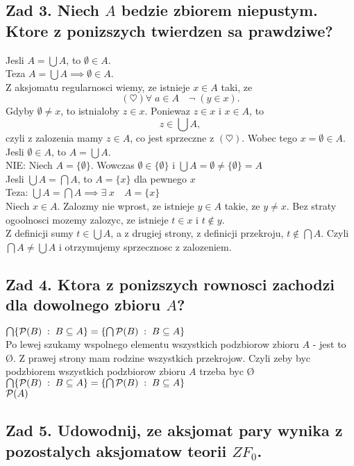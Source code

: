 \documentclass{article}
\begin{document}
\subsection*{Zad 3. Niech $A$ bedzie zbiorem niepustym. Ktore z ponizszych twierdzen sa prawdziwe?}
    {\large\color{tit}Jesli $A=\bigcup A$, to $\emptyset\in A$.}\medskip\\
    Teza $A=\bigcup A\implies\emptyset\in A$.\medskip\\
    Z aksjomatu regularnosci wiemy, ze istnieje $x\in A$ taki, ze
    $$(\heartsuit)\forall\;a\in A\quad\neg\;(y\in x).$$
    Gdyby $\emptyset\neq x$, to istnialoby $z\in x$. Poniewaz $z\in x$ i $x\in A$, to $$z\in\bigcup A,$$
    czyli z zalozenia mamy $z\in A$, co jest sprzeczne z $(\heartsuit)$. Wobec tego $x=\emptyset\in A$.\bigskip\\
    {\large\color{tit}Jesli $\emptyset\in A$, to $A=\bigcup A$.}\medskip\\
    NIE: Niech $A=\{\emptyset\}$. Wowczas $\emptyset\in \{\emptyset\}$ i $\bigcup A=\emptyset\neq\{\emptyset\}=A$\bigskip\\
    {\large\color{tit}Jesli $\bigcup A=\bigcap A$, to $A=\{x\}$ dla pewnego $x$}\medskip\\
    Teza: $\bigcup A=\bigcap A \implies \exists\;x\quad A=\{x\}$\medskip\\
    Niech $x\in A$. Zalozmy nie wprost, ze istnieje $y\in A$ takie, ze $y\neq x$. Bez straty ogoolnosci mozemy zalozyc, ze istnieje $t\in x$ i $t\notin y$.\smallskip\\
    Z definicji sumy $t\in \bigcup A$, a z drugiej strony, z definicji przekroju, $t\notin \bigcap A$. Czyli $\bigcap A\neq \bigcup A$ i otrzymujemy sprzecznosc z zalozeniem.
\subsection*{Zad 4. Ktora z ponizszych rownosci zachodzi dla dowolnego zbioru $A$?}
    {\large\color{tit}$\bigcap\{\mathcal{P}(B)\;:\;B\subseteq A\}=\{\bigcap\mathcal{P}(B)\;:\;B\subseteq A\}$}\medskip\\
    Po lewej szukamy wspolnego elementu wszystkich podzbiorow zbioru $A$ - jest to \O. Z prawej strony mam rodzine wszystkich przekrojow. Czyli zeby byc podzbiorem wszystkich podzbiorow zbioru $A$ trzeba byc \O\bigskip\\
    {\large\color{tit}$\bigcap\{\mathcal{P}(B)\;:\;B\subseteq A\}=\{\bigcap\mathcal{P}(B)\;:\;B\subseteq A\}$}
    \medskip\\
    $\mathcal{P}(A)$
\subsection*{Zad 5. Udowodnij, ze aksjomat pary wynika z pozostalych aksjomatow teorii $ZF_0$.}
\end{document}
